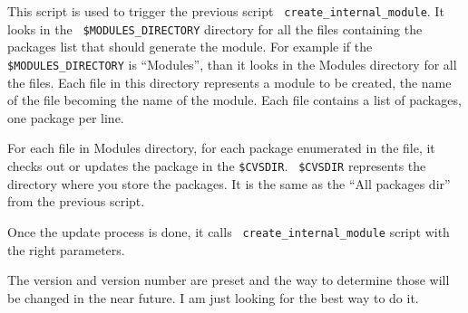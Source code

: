 This script is used to trigger the previous script {\tt
  create\_internal\_module}. It looks in the {\tt
  \$MODULES\_DIRECTORY} directory for all the files containing the
packages list that should generate the module. For example if the {\tt
  \$MODULES\_DIRECTORY} is ``Modules'', than it looks in the Modules
directory for all the files. Each file in this directory represents a
module to be created, the name of the file becoming the name of the
module. Each file contains a list of packages, one package per line.

For each file in Modules directory, for each package enumerated in the
file, it checks out or updates the package in the {\tt \$CVSDIR}. {\tt
  \$CVSDIR} represents the directory where you store the packages. It
is the same as the ``All packages dir'' from the previous script.

Once the update process is done, it calls {\tt
  create\_internal\_module} script with the right parameters.

The version and version number are preset and the way to determine
those will be changed in the near future. I am just looking for the
best way to do it.
  


